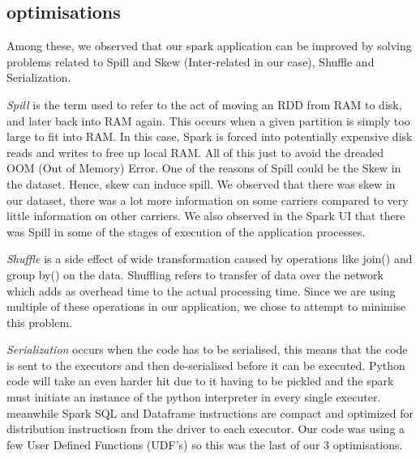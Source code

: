 \subsection{optimisations}
Among these, we observed that our spark application can be improved by solving problems related to Spill and Skew (Inter-related in our case), Shuffle and Serialization.

\emph{Spill} is the term used to refer to the act of moving an RDD from RAM to disk, and later back into RAM again. This occurs when a given partition is simply too large to fit into RAM. In this case, Spark is forced into potentially expensive disk reads and writes to free up local RAM. All of this just to avoid the dreaded OOM (Out of Memory) Error. One of the reasons of Spill could be the Skew in the dataset. Hence, skew can induce spill. We observed that there was skew in our dataset, there was a lot more information on some carriers compared to very little information on other carriers. We also observed in the Spark UI that there was Spill in some of the stages of execution of the application processes.

\emph{Shuffle} is a side effect of wide transformation caused by operations like join() and group by() on the data. Shuffling refers to transfer of data over the network which adds as overhead time to the actual processing time. Since we are using multiple of these operations in our application, we chose to attempt to minimise this problem.

\emph{Serialization} occurs when the code has to be serialised, this means that the code is sent to the executors and then de-serialised before it can be executed. Python code will take an even harder hit due to it having to be pickled and the spark must initiate an instance of the python interpreter in every single executer. meanwhile Spark SQL and Dataframe instructions are compact and optimized for distribution instructiosn from the driver to each executor. Our code was using a few User Defined Functions (UDF's) so this was the last of our 3 optimisations.

